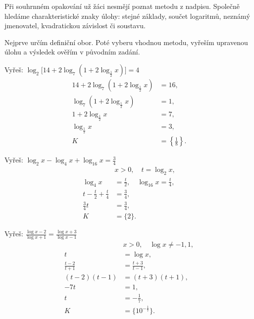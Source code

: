 \documentclass[11pt,a4paper]{article}
\begin{document}
Při souhrnném opakování už žáci nesmějí poznat metodu z nadpisu. Společně hledáme charakteristické znaky úlohy: stejné základy, součet logaritmů, neznámý jmenovatel, kvadratickou závislost či soustavu.

Nejprve určím definiční obor. Poté vyberu vhodnou metodu, vyřeším upravenou úlohu a výsledek ověřím v původním zadání.


\begin{prikladReseniBox}[title={Příklad 1}]
Vyřeš: $\displaystyle \log_2\bigl[14+2\log_7(1+2\log_{\frac12}x)\bigr]=4$
\tcblower
\[
\begin{aligned}
14+2\log_7(1+2\log_{\frac12}x)&=16,\\
\log_7(1+2\log_{\frac12}x)&=1,\\
1+2\log_{\frac12}x&=7,\\
\log_{\frac12}x&=3,\\
K&=\left\{\frac18\right\}.
\end{aligned}
\]
\end{prikladReseniBox}
\begin{prikladReseniBox}[title={Příklad 2}]
Vyřeš: $\displaystyle \log_2 x-\log_4 x+\log_{16}x=\frac34$
\tcblower
\[
\begin{aligned}
&x>0,\quad t=\log_2x,\\
\log_4x&=\frac{t}{2},\quad\log_{16}x=\frac{t}{4},\\
t-\frac t2+\frac t4&=\frac34,\\
\frac34 t&=\frac34,\\
K&=\{2\}.
\end{aligned}
\]
\end{prikladReseniBox}
\begin{prikladReseniBox}[title={Příklad 3}]
Vyřeš: $\displaystyle \frac{\log x-2}{\log x+1}=\frac{\log x+3}{\log x-1}$
\tcblower
\[
\begin{aligned}
&x>0,\quad\log x\ne-1,1,\\
t&=\log x,\\
\frac{t-2}{t+1}&=\frac{t+3}{t-1},\\
(t-2)(t-1)&=(t+3)(t+1),\\
-7t&=1,\\
t&=-\frac17,\\
K&=\{10^{-\frac17}\}.
\end{aligned}
\]
\end{prikladReseniBox}
\end{document}
